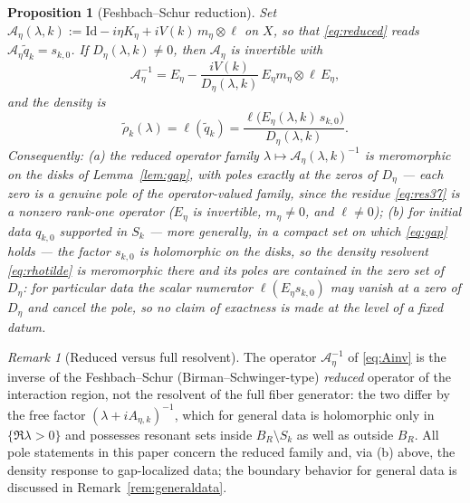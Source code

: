 \documentclass[11pt,a4paper]{amsart}
\newtheorem{proposition}[theorem]{Proposition}
\theoremstyle{definition}
\theoremstyle{remark}
\newtheorem{remark}[theorem]{Remark}
\newcommand{\Id}{\mathrm{Id}}
\newcommand{\ellf}{\ell}
\newcommand{\sA}{\mathscr{A}}
\begin{document}
\begin{proposition}[Feshbach--Schur reduction]\label{prop:schur}
Set $\sA_\eta(\lambda,k):=\Id-i\eta K_\eta+iV(k)\,m_\eta\otimes\ellf$ on $X$, so that \eqref{eq:reduced} reads $\sA_\eta\widetilde q_k=s_{k,0}$. If $D_\eta(\lambda,k)\ne0$, then $\sA_\eta$ is invertible with
\begin{equation}\label{eq:Ainv}
\sA_\eta^{-1}=E_\eta-\frac{iV(k)}{D_\eta(\lambda,k)}\,E_\eta m_\eta\otimes\ellf\,E_\eta,
\end{equation}
and the density is
\begin{equation}\label{eq:rhotilde}
\widetilde\rho_k(\lambda)=\ellf(\widetilde q_k)=\frac{\ellf\bigl(E_\eta(\lambda,k)\,s_{k,0}\bigr)}{D_\eta(\lambda,k)} .
\end{equation}
Consequently: \textup{(a)} the reduced operator family $\lambda\mapsto\sA_\eta(\lambda,k)^{-1}$ is meromorphic on the disks of Lemma~\textup{\ref{lem:gap}}, with poles exactly at the zeros of $D_\eta$ --- each zero is a genuine pole of the operator-valued family, since the residue \eqref{eq:res37} is a nonzero rank-one operator ($E_\eta$ is invertible, $m_\eta\ne0$, and $\ellf\ne0$); \textup{(b)} for initial data $q_{k,0}$ supported in $S_k$ --- more generally, in a compact set on which \eqref{eq:gap} holds --- the factor $s_{k,0}$ is holomorphic on the disks, so the density resolvent \eqref{eq:rhotilde} is meromorphic there and its poles are \emph{contained in} the zero set of $D_\eta$: for particular data the scalar numerator $\ellf(E_\eta s_{k,0})$ may vanish at a zero of $D_\eta$ and cancel the pole, so no claim of exactness is made at the level of a fixed datum.
\end{proposition}

\begin{remark}[Reduced versus full resolvent]\label{rem:reducedvsfull}
The operator $\sA_\eta^{-1}$ of \eqref{eq:Ainv} is the inverse of the Feshbach--Schur (Birman--Schwinger-type) \emph{reduced} operator of the interaction region, not the resolvent of the full fiber generator: the two differ by the free factor $(\lambda+iA_{\eta,k})^{-1}$, which for general data is holomorphic only in $\{\Re\lambda>0\}$ and possesses resonant sets inside $B_R\setminus S_k$ as well as outside $B_R$. All pole statements in this paper concern the reduced family and, via \textup{(b)} above, the density response to gap-localized data; the boundary behavior for general data is discussed in Remark~\ref{rem:generaldata}.
\end{remark}
\end{document}

